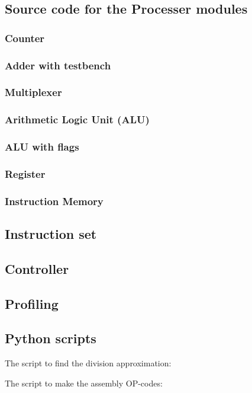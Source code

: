 \documentclass[12pt,a4paper]{article}
\begin{document}
\subsection{Source code for the Processer modules}
	\subsubsection{Counter}
			
	\subsubsection{Adder with testbench}
			
	\subsubsection{Multiplexer}
			
	\subsubsection{Arithmetic Logic Unit (ALU)}
		
	\subsubsection{ALU with flags}
			
	\subsubsection{Register}
			
	\subsubsection{Instruction Memory}
			
\subsection{Instruction set}
		
\subsection{Controller}
	
\subsection{Profiling}
	\label{toggle_full}	
	

\subsection{Python scripts}
	The script to find the division approximation:
	
	
	The script to make the assembly OP-codes:
		
\end{document}
